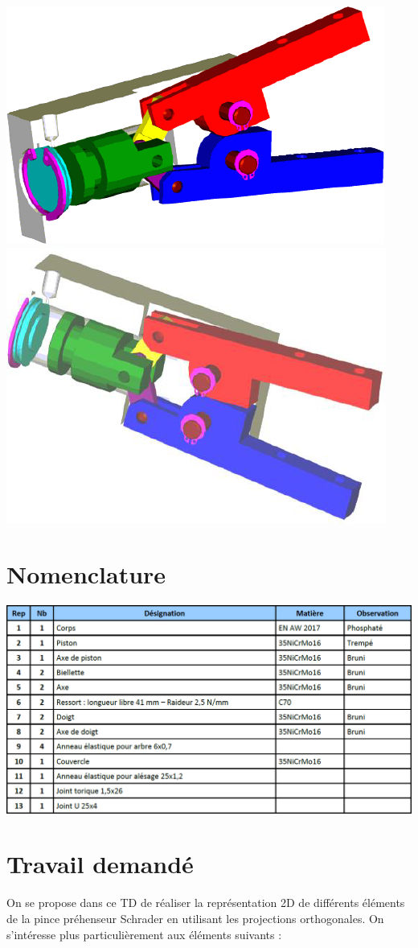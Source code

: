 \documentclass[11pt,oneside]{article}
\begin{document}
\begin{center}
\includegraphics[width=.45\textwidth]{png/fig5_1}
\includegraphics[width=.45\textwidth]{png/fig5_2}
\end{center}

\section*{Nomenclature}

\begin{center}
\includegraphics[width=.9\textwidth]{png/fig6}
\end{center}


\section*{Travail demandé}

On se propose dans ce TD de réaliser la représentation 2D de différents éléments de la pince préhenseur Schrader en utilisant les projections orthogonales. On s’intéresse plus particulièrement aux éléments suivants :
\end{document}
